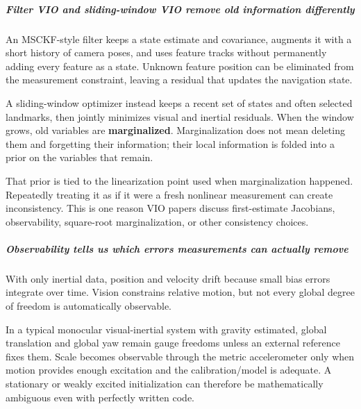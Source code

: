 \subparagraph{Filter VIO and sliding-window VIO remove old information differently}\label{04-visual-computing-ii-ch035-filter-vio-and-sliding-window-vio-remove-old-information-differently}

\hypertarget{04-visual-computing-ii-ch035-filter-vio-and-sliding-window-vio-remove-old-information-differently}{}

An MSCKF-style filter keeps a state estimate and covariance, augments it with a short history of camera poses, and uses feature tracks without permanently adding every feature as a state. Unknown feature position can be eliminated from the measurement constraint, leaving a residual that updates the navigation state.

A sliding-window optimizer instead keeps a recent set of states and often selected landmarks, then jointly minimizes visual and inertial residuals. When the window grows, old variables are \textbf{marginalized}. Marginalization does not mean deleting them and forgetting their information; their local information is folded into a prior on the variables that remain.

That prior is tied to the linearization point used when marginalization happened. Repeatedly treating it as if it were a fresh nonlinear measurement can create inconsistency. This is one reason VIO papers discuss first-estimate Jacobians, observability, square-root marginalization, or other consistency choices.

\subparagraph{Observability tells us which errors measurements can actually remove}\label{04-visual-computing-ii-ch035-observability-tells-us-which-errors-measurements-can-actually-remove}

\hypertarget{04-visual-computing-ii-ch035-observability-tells-us-which-errors-measurements-can-actually-remove}{}

With only inertial data, position and velocity drift because small bias errors integrate over time. Vision constrains relative motion, but not every global degree of freedom is automatically observable.

In a typical monocular visual-inertial system with gravity estimated, global translation and global yaw remain gauge freedoms unless an external reference fixes them. Scale becomes observable through the metric accelerometer only when motion provides enough excitation and the calibration/model is adequate. A stationary or weakly excited initialization can therefore be mathematically ambiguous even with perfectly written code.

